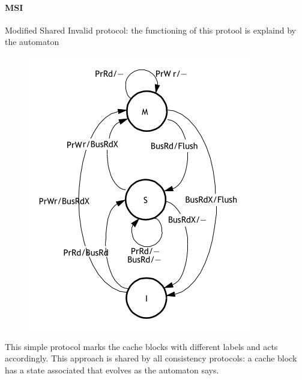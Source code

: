 \documentclass[10pt,a4paper]{article}
\begin{document}
					\paragraph{MSI}
						Modified Shared Invalid protocol: the functioning of this protool is explaind by the automaton
						\begin{figure}[H]
							\centering
							\includegraphics[width = \textwidth]{./images/MSI.png}
						\end{figure}
						This simple protocol marks the cache blocks with different labels and acts accordingly. This approach is shared by all consistency protocols: a cache block has a state associated that evolves as the automaton says.
						
\end{document}
